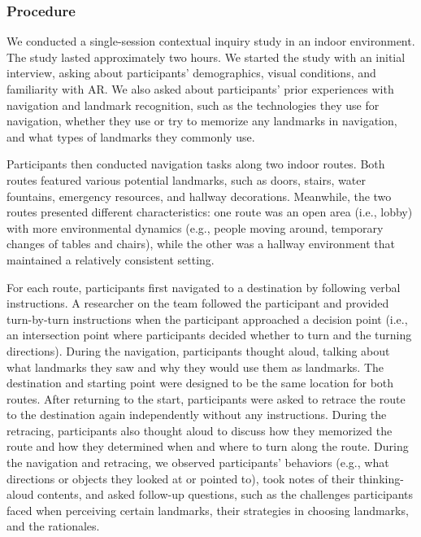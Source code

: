 \subsubsection{Procedure}
We conducted a single-session contextual inquiry study in an indoor environment. The study lasted approximately two hours. We started the study with an initial interview, asking about participants' demographics, visual conditions, and familiarity with AR. We also asked about participants' prior experiences with navigation and landmark recognition, such as the technologies they use for navigation, whether they use or try to memorize any landmarks in navigation, and what types of landmarks they commonly use.%

Participants then conducted navigation tasks along two indoor routes. Both routes featured various potential landmarks, such as doors, stairs, water fountains, emergency resources, and hallway decorations. Meanwhile, the two routes presented different characteristics: one route was an open area (i.e., lobby) with more environmental dynamics (e.g., people moving around, temporary changes of tables and chairs), while the other was a hallway environment that maintained a relatively consistent setting.

For each route, participants first navigated to a destination by following verbal instructions. A researcher on the team followed the participant and provided turn-by-turn instructions when the participant approached a decision point (i.e., an intersection point where participants decided whether to turn and the turning directions). During the navigation, participants thought aloud, talking about what landmarks they saw and why they would use them as landmarks. The destination and starting point were designed to be the same location for both routes. After returning to the start, participants were asked to retrace the route to the destination again independently without any instructions. During the retracing, participants also thought aloud to discuss how they memorized the route and how they determined when and where to turn along the route. During the navigation and retracing, we observed participants' behaviors (e.g., what directions or objects they looked at or pointed to), took notes of their thinking-aloud contents, and asked follow-up questions, such as the challenges participants faced when perceiving certain landmarks, their strategies in choosing landmarks, and the rationales.

